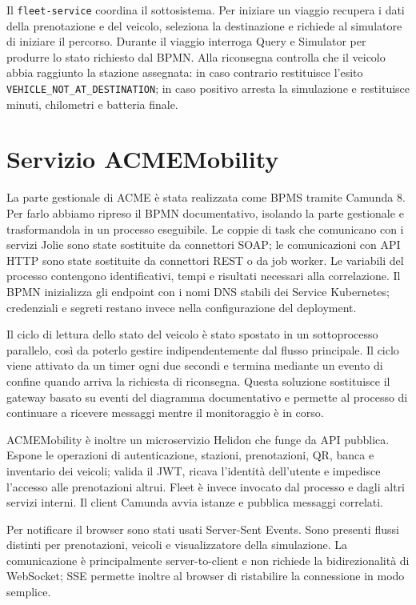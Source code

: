\documentclass[12pt,a4paper,twoside]{report}
\newcommand{\code}[1]{\texttt{#1}}
\begin{document}
Il \code{fleet-service} coordina il sottosistema. Per iniziare un viaggio
recupera i dati della prenotazione e del veicolo, seleziona la destinazione e
richiede al simulatore di iniziare il percorso. Durante il viaggio interroga
Query e Simulator per produrre lo stato richiesto dal BPMN. Alla
riconsegna controlla che il veicolo abbia raggiunto la stazione assegnata:
in caso contrario restituisce l'esito
\code{VEHICLE\_NOT\_AT\_DESTINATION}; in caso positivo arresta la simulazione
e restituisce minuti, chilometri e batteria finale.

\section{Servizio ACMEMobility}

La parte gestionale di ACME è stata realizzata come BPMS tramite Camunda 8.
Per farlo abbiamo ripreso il BPMN documentativo, isolando la parte gestionale
e trasformandola in un processo eseguibile. Le coppie di task che comunicano
con i servizi Jolie sono state sostituite da connettori SOAP; le
comunicazioni con API HTTP sono state sostituite da connettori REST o da job
worker. Le variabili del processo contengono identificativi, tempi e risultati
necessari alla correlazione. Il BPMN inizializza gli endpoint con i nomi DNS
stabili dei Service Kubernetes; credenziali e segreti restano invece nella
configurazione del deployment.

Il ciclo di lettura dello stato del veicolo è stato spostato in un
sottoprocesso parallelo, così da poterlo gestire indipendentemente dal flusso
principale. Il ciclo viene attivato da un timer ogni due secondi e termina
mediante un evento di confine quando arriva la richiesta di riconsegna.
Questa soluzione sostituisce il gateway basato su eventi del diagramma
documentativo e permette al processo di continuare a ricevere messaggi mentre
il monitoraggio è in corso.

ACMEMobility è inoltre un microservizio Helidon che funge da API pubblica.
Espone le operazioni di autenticazione, stazioni, prenotazioni, QR, banca e
inventario dei veicoli; valida il JWT, ricava l'identità dell'utente e
impedisce l'accesso alle prenotazioni altrui. Fleet è invece invocato dal
processo e dagli altri servizi interni. Il client Camunda avvia istanze e
pubblica messaggi correlati.

Per notificare il browser sono stati usati Server-Sent Events. Sono presenti
flussi distinti per prenotazioni, veicoli e visualizzatore della simulazione.
La comunicazione è principalmente server-to-client e non richiede la
bidirezionalità di WebSocket; SSE permette inoltre al browser di ristabilire
la connessione in modo semplice.
\end{document}
